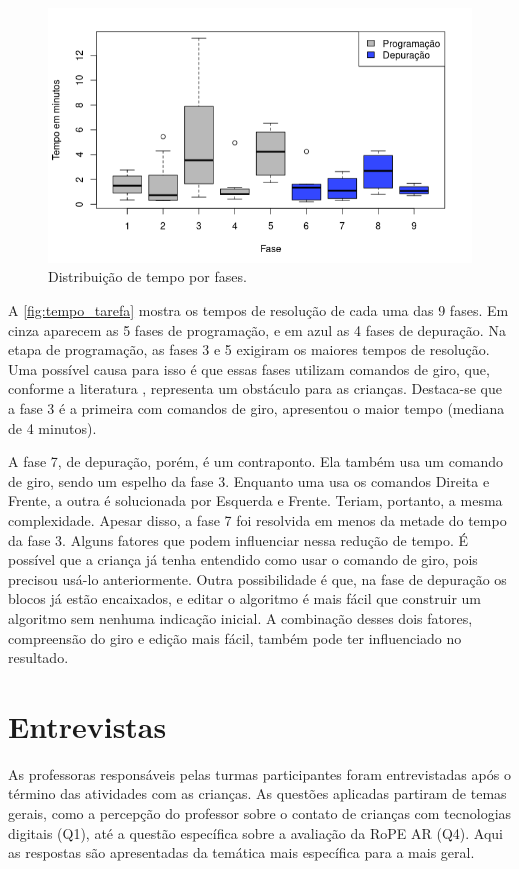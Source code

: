  \begin{figure}[!htpb]
    \centering
    \includegraphics[width=.6\linewidth,fbox]{figs/tempos_por_tarefa.png}
    \caption{Distribuição de tempo por fases.}
    \sourceauthor
    \label{fig:tempo_tarefa}
\end{figure}

A \autoref{fig:tempo_tarefa} mostra os tempos de resolução de cada uma das 9 fases. Em cinza aparecem as 5 fases de programação, e em azul as 4 fases de depuração. Na etapa de programação, as fases 3 e 5 exigiram os maiores tempos de resolução. Uma possível causa para isso é que essas fases utilizam comandos de giro, que, conforme a literatura \cite{piaget_development_1964},  representa um obstáculo para as crianças. Destaca-se que a fase 3 é a primeira com comandos de giro, apresentou o maior tempo (mediana de 4 minutos).

A fase 7, de depuração, porém, é um contraponto. Ela também usa um comando de giro, sendo um espelho da fase 3. Enquanto uma usa os comandos Direita e Frente, a outra é solucionada por Esquerda e Frente. Teriam, portanto, a mesma complexidade. Apesar disso, a fase 7 foi resolvida em menos da metade do tempo da fase 3. Alguns fatores que podem influenciar nessa redução de tempo. É possível que a criança já tenha entendido como usar o comando de giro, pois precisou usá-lo anteriormente. Outra possibilidade é que, na fase de depuração os blocos já estão encaixados, e editar o algoritmo é mais fácil que construir um algoritmo sem nenhuma indicação inicial. A combinação desses dois fatores, compreensão do giro e edição mais fácil, também pode ter influenciado no resultado.

\section{Entrevistas}
As professoras responsáveis pelas turmas participantes foram entrevistadas após o término das atividades com as crianças. As questões aplicadas partiram de temas gerais, como a percepção do professor sobre o contato de crianças com tecnologias digitais (Q1), até a questão específica sobre a avaliação da RoPE AR (Q4). Aqui as respostas são apresentadas da temática mais específica para a mais geral.

